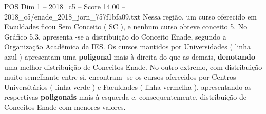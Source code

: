 \begin{textsample}{POS Dim 1 – 2018\_c5 – Score 14.00 – 2018\_c5/enade\_2018\_jorn\_757f1bfa09.txt}
Nessa região, um curso oferecido em Faculdades ficou Sem Conceito ( SC ), e nenhum curso obteve conceito 5.
No Gráfico 5.3, apresenta -se a distribuição do Conceito Enade, segundo a Organização Acadêmica da IES.
Os cursos mantidos por Universidades ( linha azul ) apresentam uma \textbf{poligonal} mais à direita do que as demais, \textbf{denotando} uma melhor distribuição de Conceitos Enade.
No outro extremo, com distribuição muito semelhante entre si, encontram -se os cursos oferecidos por Centros Universitários ( linha verde ) e Faculdades ( linha vermelha ), apresentando as respectivas \textbf{poligonais} mais à esquerda e, consequentemente, distribuição de Conceitos Enade com menores valores.

\end{textsample}
